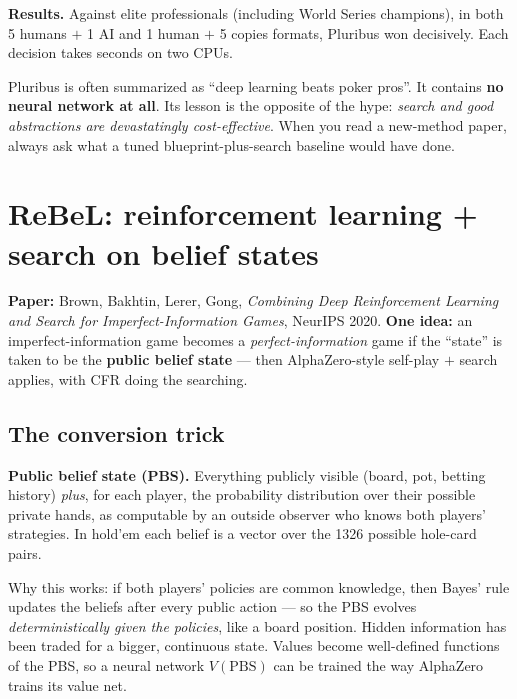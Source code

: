 \documentclass[11pt,a4paper]{article}
\begin{document}
\textbf{Results.} Against elite professionals (including World Series
champions), in both 5 humans $+$ 1 AI and 1 human $+$ 5 copies formats,
Pluribus won decisively. Each decision takes seconds on two CPUs.

\begin{trap}
Pluribus is often summarized as ``deep learning beats poker pros''. It
contains \textbf{no neural network at all}. Its lesson is the opposite of the
hype: \emph{search and good abstractions are devastatingly cost-effective}.
When you read a new-method paper, always ask what a tuned
blueprint-plus-search baseline would have done.
\end{trap}

\section{ReBeL: reinforcement learning + search on belief states}

\textbf{Paper:} Brown, Bakhtin, Lerer, Gong, \emph{Combining Deep Reinforcement
Learning and Search for Imperfect-Information Games}, NeurIPS 2020. \quad
\textbf{One idea:} an imperfect-information game becomes a
\emph{perfect-information} game if the ``state'' is taken to be the
\textbf{public belief state} --- then AlphaZero-style self-play $+$ search
applies, with CFR doing the searching.

\subsection{The conversion trick}

\begin{defbox}
\textbf{Public belief state (PBS).} Everything publicly visible (board,
pot, betting history) \emph{plus}, for each player, the probability
distribution over their possible private hands, as computable by an outside
observer who knows both players' strategies. In hold'em each belief is a
vector over the 1326 possible hole-card pairs.
\end{defbox}

Why this works: if both players' policies are common knowledge, then Bayes'
rule updates the beliefs after every public action --- so the PBS evolves
\emph{deterministically given the policies}, like a board position. Hidden
information has been traded for a bigger, continuous state. Values become
well-defined functions of the PBS, so a neural network $V(\mathrm{PBS})$ can
be trained the way AlphaZero trains its value net.
\end{document}
